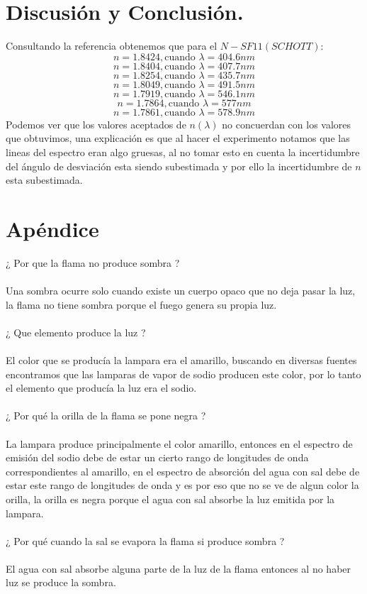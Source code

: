 \documentclass[DIV=calc, paper=a4, fontsize=11pt]{scrartcl}
\begin{document}
\section*{\textcolor{carmine}{Discusión y Conclusión.}}
Consultando la referencia \cite{indices} obtenemos que para el $ N-SF11 (SCHOTT) $:
$$ n=1.8424, \text{cuando } \lambda = 404.6 nm$$
$$ n=1.8404, \text{cuando } \lambda = 407.7 nm$$
$$ n=1.8254, \text{cuando } \lambda = 435.7 nm$$
$$ n=1.8049, \text{cuando } \lambda = 491.5 nm$$
$$ n=1.7919, \text{cuando } \lambda = 546.1 nm$$
$$ n=1.7864, \text{cuando } \lambda = 577 nm$$
$$ n=1.7861, \text{cuando } \lambda = 578.9 nm$$
Podemos ver que los valores aceptados de $n(\lambda)$ no concuerdan con los valores que obtuvimos, una explicación es que al hacer el experimento notamos que las lineas del espectro eran algo gruesas, al no tomar esto en cuenta la incertidumbre del ángulo de desviación esta siendo subestimada y por ello la incertidumbre de $n$ esta subestimada.
\nocite{*}


\section*{\textcolor{carmine}{Apéndice}}
¿ Por que la flama no produce sombra ?
\\\\
Una sombra ocurre solo cuando existe un cuerpo opaco que no deja pasar la luz, la flama no tiene sombra porque el fuego genera su propia luz.
\\\\
¿ Que elemento produce la luz ?
\\\\
El color que se producía la lampara era el amarillo, buscando en diversas fuentes encontramos que las lamparas de vapor de sodio producen este color, por lo tanto el elemento que producía la luz era el sodio.
\\\\
¿ Por qué la orilla de la flama se pone negra ?
\\\\
La lampara produce principalmente el color amarillo, entonces en el espectro de emisión del sodio debe de estar un cierto rango de longitudes de onda correspondientes al amarillo, en el espectro de absorción del agua con sal debe de estar este rango de longitudes de onda y es por eso que no se ve de algun color la orilla, la orilla es negra porque el agua con sal absorbe la luz emitida por la lampara.
\\\\
¿ Por qué cuando la sal se evapora la flama si produce sombra ?
\\\\
El agua con sal absorbe alguna parte de la luz de la flama entonces al no haber luz se produce la sombra.
\end{document}
